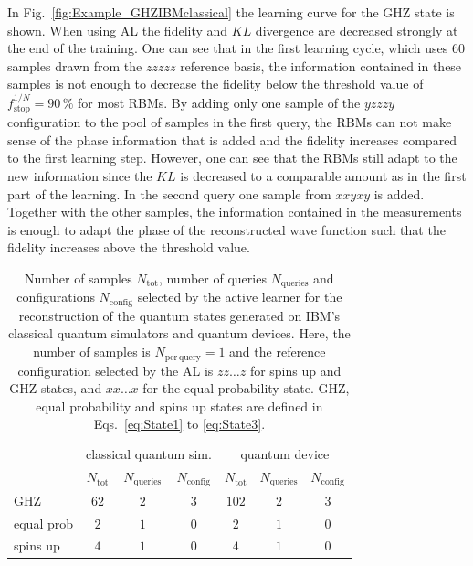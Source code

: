 \documentclass[pra,aps,showpacs,groupedaddress,superscriptaddress,twocolumn,toc=flat,biblatex,footinbib]{revtex4-1}
\begin{document}
In Fig.~\ref{fig:Example_GHZIBMclassical} the learning curve for the GHZ state is shown. When using AL the fidelity and $KL$ divergence are decreased strongly at the end of the training. One can see that in the first learning cycle, which uses $60$ samples drawn from the $zzzzz$ reference basis, the information contained in these samples is not enough to decrease the fidelity below the threshold value of $f^{1/N}_{\mathrm{stop}}=90\,\%$ for most RBMs. By adding only one sample of the $yzzzy$ configuration to the pool of samples in the first query, the RBMs can not make sense of the phase information that is added and the fidelity increases compared to the first learning step. However, one can see that the RBMs still adapt to the new information since the $KL$ is decreased to a comparable amount as in the first part of the learning. In the second query one sample from $xxyxy$ is added. Together with the other samples, the information contained in the measurements is enough to adapt the phase of the reconstructed wave function such that  the fidelity increases above the threshold value. 

\begin{table}[]
\begin{tabular}{l|ccc|ccc}
           & \multicolumn{3}{c|}{classical quantum sim.} & \multicolumn{3}{c}{quantum device} \\
           & $N_{\mathrm{tot}}$ & $N_{\mathrm{queries}}$         & $N_{\mathrm{config}}$      & $N_{\mathrm{tot}}$     & $N_{\mathrm{queries}}$   & $N_{\mathrm{config}}$       \\\hline
GHZ        &    $62$            &    $2$               &     $3$    &    $102$          &   $2$  &     $3$                 \\
equal prob &    $2$            &   $1$                   &     $0$ &     $2$         &   $1$           &     $0$        \\
spins up   &   $4$             &     $1$ &     $0$                &        $4$      &    $1$   &     $0$              
\end{tabular}
\caption{Number of samples $N_{\mathrm{tot}}$, number of queries $N_{\mathrm{queries}}$ and configurations $N_{\mathrm{config}}$ selected by the active learner for the reconstruction of the quantum states generated on IBM's classical quantum simulators and quantum devices. Here, the number of samples is $N_{\mathrm{per\,query}}=1$ and the reference configuration selected by the AL is $zz\dots z$ for spins up and GHZ states, and $xx\dots x$ for the equal probability state. GHZ, equal probability and spins up states are defined in Eqs.~\eqref{eq:State1} to \eqref{eq:State3}.}
\label{tab:Samples_IBM}
\end{table}
\end{document}
